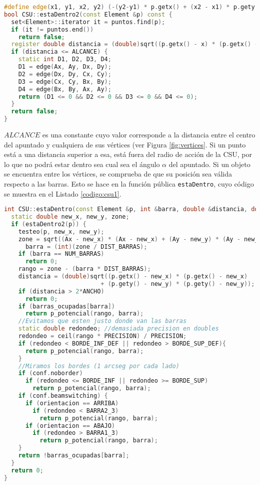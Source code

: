 \begin{lstlisting}[float=tp,language=C++, basicstyle=\ttfamily\footnotesize,caption={Código del ray casting simplificado},label={codigo:csu0}]                  
#define edge(x1, y1, x2, y2) (-(y2-y1) * p.getx() + (x2 - x1) * p.gety() - (-(y2-y1)*x1 + (x2-x1)*y1))
bool CSU::estaDentro2(const Element &p) const {
  set<Element>::iterator it = puntos.find(p);
  if (it != puntos.end())
    return false;
  register double distancia = (double)sqrt((p.getx() - x) * (p.getx() - x) + (p.gety() -y) * (p.gety() -y));
  if (distancia <= ALCANCE) {
    static int D1, D2, D3, D4;
    D1 = edge(Ax, Ay, Dx, Dy);
    D2 = edge(Dx, Dy, Cx, Cy);
    D3 = edge(Cx, Cy, Bx, By);
    D4 = edge(Bx, By, Ax, Ay);
    return (D1 <= 0 && D2 <= 0 && D3 <= 0 && D4 <= 0);
  }
  return false;
}

\end{lstlisting}

$ALCANCE$ es una constante cuyo valor corresponde a la distancia entre
el centro del apuntado y cualquiera de sus vértices (ver Figura
\ref{fig:vertices}. Si un punto está a una
distancia superior a esa, está fuera del radio de acción de la CSU, por lo que
no podrá estar dentro sea cual sea el ángulo $\alpha$ del apuntado. Si un objeto
se encuentra entre los vértices, se comprueba de que su posición sea válida
respecto a las barras. 
Esto se hace en la función pública \texttt{estaDentro},
cuyo código se muestra en el Listado \ref{codigo:csu1}.

\begin{lstlisting}[float=tp,language=C++,basicstyle=\ttfamily\footnotesize,
                   caption={Función que comprueba si un objeto está en la CSU},
                   label={codigo:csu1}]                  
int CSU::estaDentro(const Element &p, int &barra, double &distancia, double &rango) const {
  static double new_x, new_y, zone;
  if (estaDentro2(p)) {
    testeo(p, new_x, new_y);
    zone = sqrt((Ax - new_x) * (Ax - new_x) + (Ay - new_y) * (Ay - new_y));
	  barra = (int)(zone / DIST_BARRAS);
    if (barra == NUM_BARRAS)
      return 0;
    rango = zone - (barra * DIST_BARRAS);
    distancia = (double)sqrt((p.getx() - new_x) * (p.getx() - new_x) 
                           + (p.gety() - new_y) * (p.gety() - new_y));
    if (distancia > 2*ANCHO)
      return 0;
    if (barras_ocupadas[barra]) 
      return p_potencial(rango, barra);
    //Evitamos que esten justo donde van las barras
    static double redondeo; //demasiada precision en doubles
    redondeo = ceil(rango * PRECISION) / PRECISION;
    if (redondeo < BORDE_INF_DEF || redondeo > BORDE_SUP_DEF){
      return p_potencial(rango, barra);
    }
    //Miramos los bordes (1 arcseg por cada lado)
    if (conf.noborder) 
      if (redondeo <= BORDE_INF || redondeo >= BORDE_SUP)
        return p_potencial(rango, barra);
    if (conf.beamswitching) {
      if (orientacion == ARRIBA) 
        if (redondeo < BARRA2_3)
          return p_potencial(rango, barra);
      if (orientacion == ABAJO)
        if (redondeo > BARRA1_3)
          return p_potencial(rango, barra);
    }
    return !barras_ocupadas[barra];
  }
  return 0;
}
\end{lstlisting}

